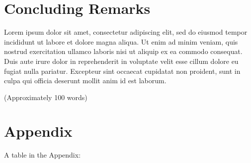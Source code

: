 \documentclass[12pt,preprint, authoryear]{article}
\numberwithin{equation}{section}
\numberwithin{figure}{section}
\numberwithin{table}{section}
\begin{document}
\section{\texorpdfstring{Concluding Remarks
\label{Concl}}{Concluding Remarks }}\label{concluding-remarks}

Lorem ipsum dolor sit amet, consectetur adipiscing elit, sed do eiusmod
tempor incididunt ut labore et dolore magna aliqua. Ut enim ad minim
veniam, quis nostrud exercitation ullamco laboris nisi ut aliquip ex ea
commodo consequat. Duis aute irure dolor in reprehenderit in voluptate
velit esse cillum dolore eu fugiat nulla pariatur. Excepteur sint
occaecat cupidatat non proident, sunt in culpa qui officia deserunt
mollit anim id est laborum.

(Approximately 100 words)

\newpage

\section*{Appendix}\label{appendix}

\setcounter{table}{0} \renewcommand{\thetable}{A\arabic{table}}

A table in the Appendix:

\onehalfspacing
\scriptsize
\end{document}
